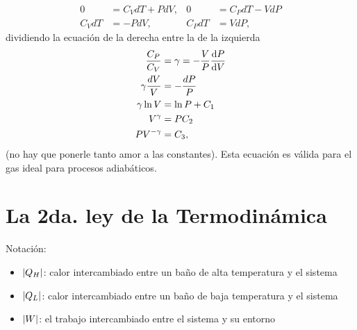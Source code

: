 \begin{enumerate}
\begin{align*}
0&=C_VdT+PdV, & 0&=C_PdT-VdP\\
C_VdT&=-PdV, & C_PdT&=VdP,
\end{align*}
dividiendo la ecuación de la derecha entre la de la izquierda
\begin{align}
\frac{C_P}{C_V}&=\gamma=-\frac{V}{P}\dv{P}{V}\nonumber\\
\gamma \frac{dV}{V}&=-\frac{dP}{P} \nonumber\\
\gamma\ln V&=\ln P+C_1\nonumber\\
V^{\gamma}&=PC_2 \nonumber\\
PV^{-\gamma}&=C_3,
\label{eq:StEq-IdealGas-Adiabatic}
\end{align}
(no hay que ponerle tanto amor a las constantes). Esta  
ecuación es válida para el gas ideal para procesos adiabáticos.
\end{enumerate}

\section{La 2da. ley de la Termodinámica}
Notación:
\begin{itemize}
\item $\abs{Q_H}$: calor intercambiado entre un baño de
alta temperatura y el sistema
\item $\abs{Q_L}$: calor intercambiado entre un baño de 
baja temperatura y el sistema
\item $\abs{W}$: el trabajo intercambiado entre el sistema
y su entorno
\end{itemize}

